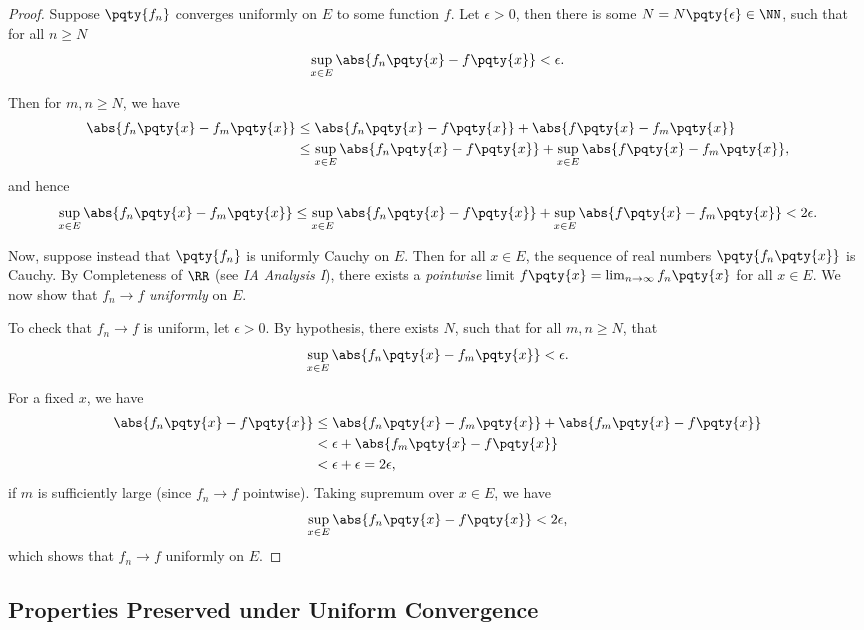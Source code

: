 \begin{proof}
    Suppose \(\pqty{f_n}\) converges uniformly on \(E\) to some function \(f\). Let \(\epsilon > 0\), then there is some \(N = N\pqty{\epsilon} \in \NN\), such that for all \(n \geq N\)
    \[
        \sup_{x \in E} \abs{f_n\pqty{x} - f\pqty{x}} < \epsilon.
    \]

    Then for \(m, n \geq N\), we have
    \begin{align*}
        \abs{f_n\pqty{x} - f_m\pqty{x}} &\leq \abs{f_n\pqty{x} - f\pqty{x}} + \abs{f\pqty{x} - f_m\pqty{x}} \\
        &\leq \sup_{x \in E} \abs{f_n\pqty{x} - f\pqty{x}} + \sup_{x \in E} \abs{f\pqty{x} - f_m\pqty{x}},
    \end{align*}
    and hence
    \[
        \sup_{x \in E} \abs{f_n\pqty{x} - f_m\pqty{x}} \leq \sup_{x \in E} \abs{f_n\pqty{x} - f\pqty{x}} + \sup_{x \in E} \abs{f\pqty{x} - f_m\pqty{x}} < 2\epsilon.
    \]
    
    Now, suppose instead that \(\pqty{f_n}\) is uniformly Cauchy on \(E\). Then for all \(x \in E\), the sequence of real numbers \(\pqty{f_n \pqty{x}}\) is Cauchy. By Completeness of \(\RR\) (see \textit{IA Analysis I}), there exists a \emph{pointwise} limit \(f\pqty{x} = \lim_{n \to \infty} f_n\pqty{x}\) for all \(x \in E\). We now show that \(f_n \to f\) \emph{uniformly} on \(E\).

    To check that \(f_n \to f\) is uniform, let \(\epsilon > 0\). By hypothesis, there exists \(N\), such that for all \(m, n \geq N\), that
    \[
        \sup_{x \in E} \abs{f_n\pqty{x} - f_m\pqty{x}} < \epsilon.
    \]

    For a fixed \(x\), we have
    \begin{align*}
        \abs{f_n\pqty{x} - f\pqty{x}} &\leq \abs{f_n\pqty{x} - f_m\pqty{x}} + \abs{f_m\pqty{x} - f\pqty{x}} \\
        &< \epsilon + \abs{f_m\pqty{x} - f\pqty{x}} \\
        &< \epsilon + \epsilon = 2 \epsilon,
    \end{align*}
    if \(m\) is sufficiently large (since \(f_n \to f\) pointwise). Taking supremum over \(x \in E\), we have
    \[
        \sup_{x \in E} \abs{f_n\pqty{x} - f\pqty{x}} < 2 \epsilon,
    \]
    which shows that \(f_n \to f\) uniformly on \(E\).
\end{proof}

\subsection{Properties Preserved under Uniform Convergence}

